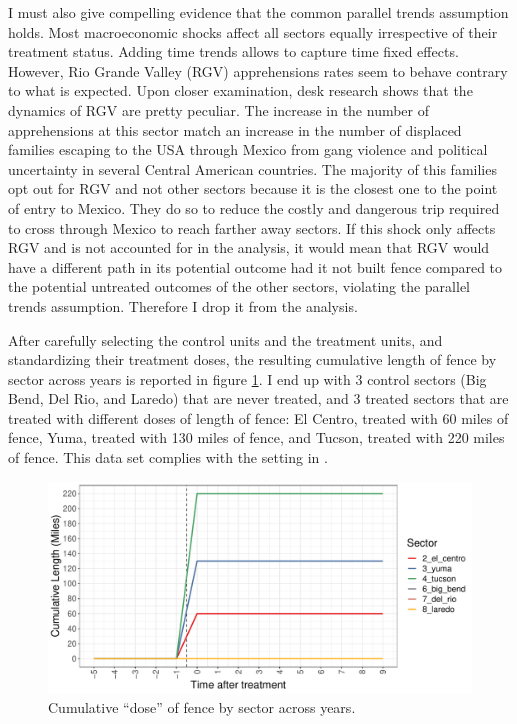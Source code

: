 \documentclass[titlepage]{article}
\theoremstyle{plain}
\theoremstyle{plain}
\begin{document}
I must also give compelling evidence that the common parallel trends assumption holds. Most macroeconomic shocks affect all sectors equally irrespective of their treatment status. Adding time trends allows to capture time fixed effects. However, Rio Grande Valley (RGV) apprehensions rates seem to behave contrary to what is expected. Upon closer examination, desk research shows that the dynamics of RGV are pretty peculiar. The increase in the number of apprehensions at this sector match an increase in the number of displaced families escaping to the USA through Mexico from gang violence and political uncertainty in several Central American countries. The majority of this families opt out for RGV and not other sectors because it is the closest one to the point of entry to Mexico. They do so to reduce the costly and dangerous trip required to cross through Mexico to reach farther away sectors. If this shock only affects RGV and is not accounted for in the analysis, it would mean that RGV would have a different path in its potential outcome had it not built fence compared to the potential untreated outcomes of the other sectors, violating the parallel trends assumption. Therefore I drop it from the analysis.

After carefully selecting the control units and the treatment units, and standardizing their treatment doses, the resulting cumulative length of fence by sector across years is reported in figure \ref{fig:plot_dose}. I end up with 3 control sectors (Big Bend, Del Rio, and Laredo) that are never treated, and 3 treated sectors that are treated with different doses of length of fence: El Centro, treated with 60 miles of fence, Yuma, treated with 130 miles of fence, and Tucson, treated with 220 miles of fence. This data set complies with the setting in \cite{callaway2021differenceindifferences}.

\begin{figure}[H]
	\centering
	\caption{Cumulative \enquote{dose} of fence by sector across years.} 
	\label{fig:plot_dose} 
	\includegraphics[width=\textwidth]{_images/plot_dose.pdf}
\end{figure}
\end{document}
